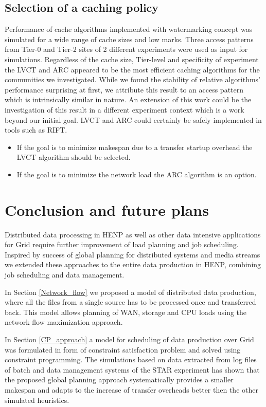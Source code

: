 \documentclass[english]{ddny}
\begin{document}
\subsection{Selection of a caching policy}
Performance of cache algorithms implemented with watermarking concept was simulated for a wide range of cache sizes and low marks. Three access patterns from Tier-0 and Tier-2 sites of 2 different experiments were used as input for simulations.
Regardless of the cache size, Tier-level and specificity of experiment the LVCT and ARC appeared to be the most efficient  caching algorithms for the communities we investigated. While we found the stability of relative  algorithms' performance surprising at first, we attribute this result to an access pattern which is intrinsically similar in nature.
An extension of this work could be the investigation of this result in a different experiment context which is a work beyond our initial goal. LVCT and ARC could certainly be safely implemented in tools such as RIFT.
\begin{itemize}
	\item If the goal is to minimize makespan due to a transfer startup overhead the LVCT algorithm should be selected.
	\item If the goal is to minimize the network load the ARC algorithm is an option.
\end{itemize}



\section{Conclusion and future plans}
Distributed data processing in HENP as well as other data intensive applications for Grid require further improvement of load planning and job scheduling. Inspired by success of global planning for distributed systems \cite{Zerola} and media streams \cite{Rudova} we extended these approaches to the entire data production in HENP, combining job scheduling and data management.  

In Section \ref{Network_flow} we proposed a model of distributed data production, where all the files from a single source has to be processed once and transferred back. This model allows planning of WAN, storage and CPU loads using the network flow maximization approach. 

In Section \ref{CP_approach} a model for scheduling of data production over Grid was formulated in form of constraint satisfaction problem and solved using constraint programming. The simulations based on data extracted from log files of batch and data management systems of the STAR experiment has shown that the proposed global planning approach systematically provides a smaller makespan and adapts to the increase of transfer overheads better then the other simulated  heuristics.
\end{document}
